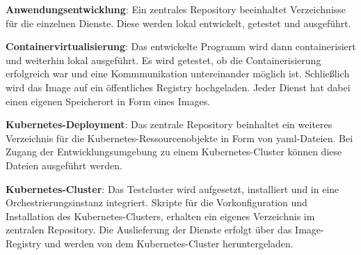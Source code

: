 \textbf{Anwendungsentwicklung}: 
Ein zentrales Repository beeinhaltet Verzeichnisse für die einzelnen Dienste.
Diese werden lokal entwickelt, getestet und ausgeführt.

\textbf{Containervirtualisierung}: 
Das entwickelte Programm wird dann containerisiert und weiterhin lokal ausgeführt.
Es wird getestet, ob die Containerisierung erfolgreich war und eine Kommmunikation untereinander möglich ist. 
Schließlich wird das Image auf ein öffentliches Registry hochgeladen. 
Jeder Dienst hat dabei einen eigenen Speicherort in Form eines Images.

\textbf{Kubernetes-Deployment}: 
Das zentrale Repository beinhaltet ein weiteres Verzeichnis für die Kubernetes-Ressourcenobjekte in Form von \acs{yaml}-Dateien.
Bei Zugang der Entwicklungsumgebung zu einem Kubernetes-Cluster können diese Dateien ausgeführt werden.

\textbf{Kubernetes-Cluster}: 
Das Testcluster wird aufgesetzt, installiert und in eine Orchestrierungsinstanz integriert.
Skripte für die Vorkonfiguration und Installation des Kubernetes-Clusters, erhalten ein eigenes Verzeichnis im zentralen Repository.
Die Auslieferung der Dienste erfolgt über das Image-Registry und werden von dem Kubernetes-Cluster heruntergeladen.



